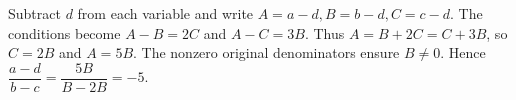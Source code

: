 Subtract $d$ from each variable and write $A=a-d,B=b-d,C=c-d$. The conditions become $A-B=2C$ and $A-C=3B$. Thus $A=B+2C=C+3B$, so $C=2B$ and $A=5B$. The nonzero original denominators ensure $B\ne0$. Hence $\dfrac{a-d}{b-c}=\dfrac{5B}{B-2B}=\boxed{-5}$.
